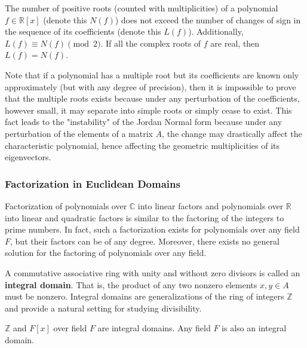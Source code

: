       \begin{theorem}
        The number of positive roots (counted with multiplicities) of a polynomial $f \in \mathbb{R}[x]$ (denote this $N(f)$) does not exceed the number of changes of sign in the sequence of its coefficients (denote this $L(f)$). Additionally, $L(f) \equiv N(f) \pmod{2}$. If all the complex roots of $f$ are real, then $L(f) = N(f)$. 
      \end{theorem}

      Note that if a polynomial has a multiple root but its coefficients are known only approximately (but with any degree of precision), then it is impossible to prove that the multiple roots exists because under any perturbation of the coefficients, however small, it may separate into simple roots or simply cease to exist. This fact leads to the "instability" of the Jordan Normal form because under any perturbation of the elements of a matrix $A$, the change may drastically affect the characteristic polynomial, hence affecting the geometric multiplicities of its eigenvectors. 

    \subsubsection{Factorization in Euclidean Domains}

      Factorization of polynomials over $\mathbb{C}$ into linear factors and polynomials over $\mathbb{R}$ into linear and quadratic factors is similar to the factoring of the integers to prime numbers. In fact, such a factorization exists for polynomials over any field $F$, but their factors can be of any degree. Moreover, there exists no general solution for the factoring of polynomials over any field. 

      \begin{definition}
        A commutative associative ring with unity and without zero divisors is called an \textbf{integral domain}. That is, the product of any two nonzero elements $x, y \in A$ must be nonzero. Integral domains are generalizations of the ring of integers $\mathbb{Z}$ and provide a natural setting for studying divisibility. 
      \end{definition}

      \begin{example}
        $\mathbb{Z}$ and $F[x]$ over field $F$ are integral domains. Any field $F$ is also an integral domain. 
      \end{example}

